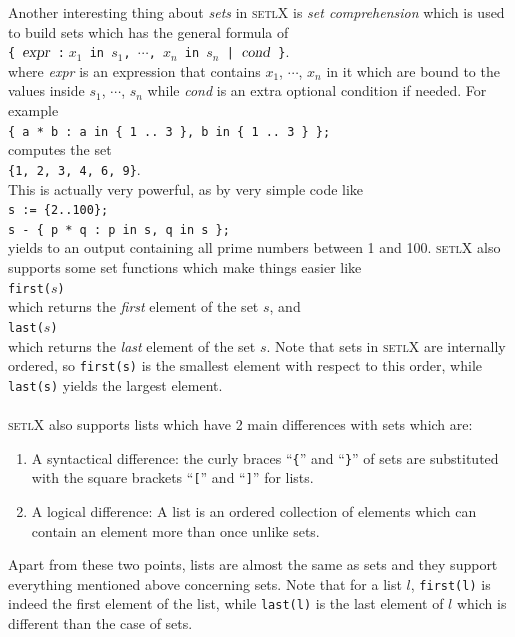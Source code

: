 \documentclass[11pt]{report}
\begin{document}
Another interesting thing about \textsl{sets} in \textsc{setlX} is \emph{set comprehension} which is used to build sets which has the general formula of
\\[0.2cm]
\hspace*{1.3cm}
\texttt{\{ $\textsl{expr}$ :$\;x_1$ in $s_1$, $\cdots$, $x_n$ in $s_n$ | $\textsl{cond}$ \}}.
\\[0.2cm]
where \textsl{expr} is an expression that contains $x_1$, $\cdots$, $x_n$ in it which are bound to the values inside $s_1$, $\cdots$, $s_n$ while \textsl{cond} is an extra optional condition if needed. For example 
\\[0.2cm]
\hspace*{1.3cm}
\texttt{\{ a * b : a in \{ 1 .. 3 \}, b in \{ 1 .. 3 \} \};}
\\[0.2cm]
computes the set
\\[0.2cm]
\hspace*{1.3cm}
\texttt{\{1, 2, 3, 4, 6, 9\}}.
\\[0.2cm]
This is actually very powerful, as by very simple code like
\\[0.2cm]
\hspace*{1.3cm}
\texttt{s := \{2..100\};}
\\
\hspace*{1.3cm}
\texttt{s - \{ p * q : p in s, q in s \};}
\\[0.2cm]
yields to an output containing all prime numbers between 1 and 100.
\textsc{setlX} also supports some set functions which make things easier like
\\[0.2cm]
\hspace*{1.3cm}
\texttt{first($s$)}
\\[0.2cm]
which returns the \emph{first} element of the set $s$, and
\\[0.2cm]
\hspace*{1.3cm}
\texttt{last($s$)} 
\\[0.2cm]
which returns the \emph{last} element of the set $s$. Note that sets in \textsc{setlX} are internally ordered, so \texttt{first(s)} is the smallest element with respect to this order, while \texttt{last(s)} yields the largest element.
\\
\\
\textsc{setlX} also supports lists which have 2 main differences with sets which are:
\begin{enumerate}
\item A syntactical difference: the
curly braces ``\texttt{\{}'' and ``\texttt{\}}'' of sets are substituted with the square brackets
``\texttt{[}'' and ``\texttt{]}'' for lists.
\item A logical difference:  A list is an ordered collection of elements which can contain an element more than once unlike sets.
\end{enumerate} 
Apart from these two points, lists are almost the same as sets and they support everything mentioned above concerning sets. Note that for a list $l$, \texttt{first(l)} is indeed the first element of the list, while \texttt{last(l)} is the last element of $l$ which is different than the case of sets.
\\
\end{document}
